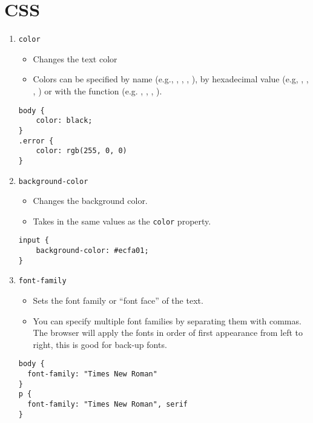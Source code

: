 \documentclass[10pt, twocolumn]{article}
\begin{document}
\section{CSS}
\begin{enumerate}

\item{\texttt{color}}  
\begin{itemize}
    \item Changes the text color
    \item Colors can be specified by name (e.g., , , , ), by hexadecimal value (e.g, , , , ) or with the  function (e.g. , , , ).
\end{itemize}
\begin{lstlisting}[frame=single]
body {
    color: black;
}
.error {
    color: rgb(255, 0, 0)
}
\end{lstlisting}

\item{\texttt{background-color}}
\begin{itemize}
    \item Changes the background color.  
    \item Takes in the same values as the \texttt{color} property.
\end{itemize}    
\begin{lstlisting}[frame=single]
input {
    background-color: #ecfa01; 
}
\end{lstlisting}
    
\item{\texttt{font-family}}
\begin{itemize}
    \item Sets the font family or ``font face'' of the text.
    \item You can specify multiple font families by separating them with commas.  The browser will apply the fonts in order of first appearance from left to right, this is good for back-up fonts.
\end{itemize}    
\begin{lstlisting}[frame=single]
body {
  font-family: "Times New Roman"
}
p {
  font-family: "Times New Roman", serif
}
\end{lstlisting}
    


\end{enumerate}
\end{document}
